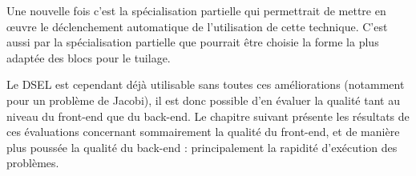 Une nouvelle fois c'est la spécialisation partielle qui permettrait de mettre en œuvre le déclenchement automatique de l'utilisation de cette technique. C'est aussi par la spécialisation partielle que pourrait être choisie la forme la plus adaptée des blocs pour le tuilage. 


Le DSEL est cependant déjà utilisable sans toutes ces améliorations (notamment pour un problème de Jacobi), il est donc possible d'en évaluer la qualité tant au niveau du front-end que du back-end. Le chapitre suivant présente les résultats de ces évaluations concernant sommairement la qualité du front-end, et de manière plus poussée la qualité du back-end : principalement la rapidité d'exécution des problèmes.
